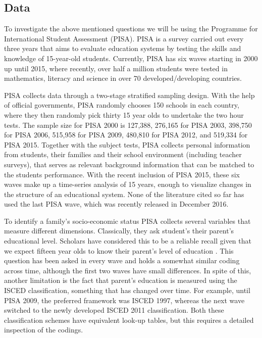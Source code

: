 \documentclass[11pt, a4paper]{article}\usepackage[]{graphicx}\usepackage[]{color}
\begin{document}
\subsection{Data}



To investigate the above mentioned questions we will be using the Programme for International Student Assessment (PISA). PISA is a survey carried out every three years that aims to evaluate education systems by testing the skills and knowledge of 15-year-old students. Currently, PISA has six waves starting in 2000 up until 2015, where recently, over half a million students were tested in mathematics, literacy and science in over 70 developed/developing countries.

PISA collects data through a two-stage stratified sampling design. With the help of official governments, PISA randomly chooses 150 schools in each country, where they then randomly pick thirty 15 year olds to undertake the two hour tests. The sample size for PISA 2000 is 127,388, 276,165 for PISA 2003, 398,750 for PISA 2006, 515,958 for PISA 2009, 480,810 for PISA 2012, and 519,334 for PISA 2015. Together with the subject tests, PISA collects personal information from students, their families and their school environment (including teacher surveys), that serves as relevant background information that can be matched to the students performance. With the recent inclusion of PISA 2015, these six waves make up a time-series analysis of 15 years, enough to visualize changes in the structure of an educational system. None of the literature cited so far has used the last PISA wave, which was recently released in December 2016.

To identify a family's socio-economic status PISA collects several variables that measure different dimensions. Classically, they ask student's their parent's educational level. Scholars have considered this to be a reliable recall given that we expect fifteen year olds to know their parent's level of education \citep{reardon2011}. This question has been asked in every wave and holds a somewhat similar coding across time, although the first two waves have small differences. In spite of this, another limitation is the fact that parent's education is measured using the ISCED classification, something that has changed over time. For example, until PISA 2009, the preferred framework was ISCED 1997, whereas the next wave switched to the newly developed ISCED 2011 classification. Both these classification schemes have equivalent look-up tables, but this requires a detailed inspection of the codings.
\end{document}
